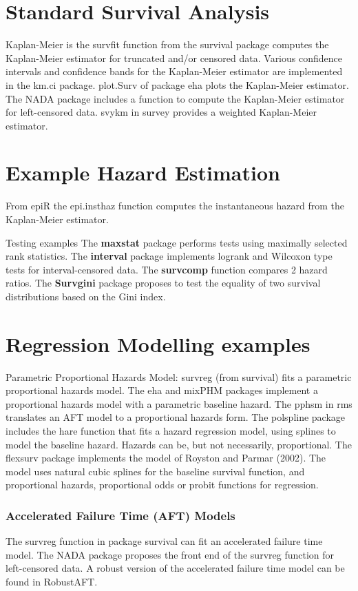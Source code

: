 \documentclass[11pt]{article} %
\begin{document}
\section{Standard Survival Analysis}
Kaplan-Meier is the survfit function from the survival package computes the Kaplan-Meier estimator for truncated and/or censored data. Various confidence intervals and confidence bands for the Kaplan-Meier estimator are implemented in the km.ci package. plot.Surv of package eha plots the Kaplan-Meier estimator. The 
NADA package includes a function to compute the Kaplan-Meier estimator for left-censored data. svykm in survey provides a weighted Kaplan-Meier estimator. 

\section{Example Hazard Estimation}
From epiR the epi.insthaz function computes the instantaneous hazard from the Kaplan-Meier estimator. 

Testing examples
The \textbf{maxstat} package performs tests using maximally selected rank statistics. 
The \textbf{interval} package implements logrank and Wilcoxon type tests for interval-censored data. 
The \textbf{survcomp} function compares 2 hazard ratios. 
The \textbf{Survgini} package proposes to test the equality of two survival distributions based on the Gini index. 
\newpage
\section{Regression Modelling examples}

Parametric Proportional Hazards Model: survreg (from survival) fits a parametric proportional hazards model. The eha and mixPHM packages implement a proportional hazards model with a parametric baseline hazard. The pphsm in rms translates an AFT model to a proportional hazards form. The polspline package includes the hare function that fits a hazard regression model, using splines to model the baseline hazard. Hazards can be, but not necessarily, proportional. The flexsurv package implements the model of Royston and Parmar (2002). The model uses natural cubic splines for the baseline survival function, and proportional hazards, proportional odds or probit functions for regression. 

\subsubsection{Accelerated Failure Time (AFT) Models} The survreg function in package survival can fit an accelerated failure time model. The NADA package proposes the front end of the survreg function for left-censored data. A robust version of the accelerated failure time model can be found in RobustAFT. 
\end{document}
